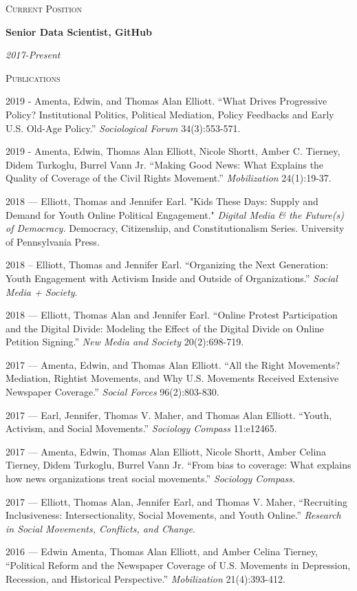 \documentclass[11pt]{article}
\newcommand{\sectionheader}[1]{
{\Large
\textsc{#1}}
}
\newcommand{\resumeitem}[2]{
\begin{minipage}{0.7\textwidth}
\begin{flushleft}
\textbf{#1}
\end{flushleft}
\end{minipage}
\begin{minipage}{0.3\textwidth}
\begin{flushright}
\emph{#2}
\end{flushright}
\end{minipage}
\hangindent=0.05\textwidth
}
\begin{document}
\sectionheader{Current Position}

\resumeitem{Senior Data Scientist, GitHub}{2017-Present}


\sectionheader{Publications}

2019 - Amenta, Edwin, and Thomas Alan Elliott. ``What Drives Progressive Policy? Institutional Politics, Political Mediation, Policy Feedbacks and Early U.S. Old-Age Policy.'' \textit{Sociological Forum} 34(3):553-571. 

2019 - Amenta, Edwin, Thomas Alan Elliott, Nicole Shortt, Amber C. Tierney, Didem Turkoglu, Burrel Vann Jr. ``Making Good News: What Explains the Quality of Coverage of the Civil Rights Movement.'' \textit{Mobilization} 24(1):19-37.

2018 --- Elliott, Thomas and Jennifer Earl. "Kids These Days: Supply and Demand for Youth Online Political Engagement." \textit{Digital Media \& the Future(s) of Democracy.} Democracy, Citizenship, and Constitutionalism Series. University of Pennsylvania Press.

2018 -- Elliott, Thomas and Jennifer Earl. ``Organizing the Next Generation: Youth Engagement with Activism Inside and Outside of Organizations.'' \textit{Social Media + Society}.

2018 --- Elliott, Thomas Alan and Jennifer Earl. ``Online Protest Participation and the Digital Divide: Modeling the Effect of the Digital Divide on Online Petition Signing.'' \textit{New Media and Society} 20(2):698-719.

2017 --- Amenta, Edwin, and Thomas Alan Elliott. ``All the Right Movements?
Mediation, Rightist Movements, and Why U.S. Movements Received Extensive Newspaper Coverage.'' \textit{Social Forces} 96(2):803-830. 

2017 --- Earl, Jennifer, Thomas V. Maher, and Thomas Alan Elliott. ``Youth, Activism, and Social Movements.'' \textit{Sociology Compass} 11:e12465.

2017 --- Amenta, Edwin, Thomas Alan Elliott, Nicole Shortt, Amber Celina Tierney, Didem Turkoglu, Burrel Vann Jr. ``From bias to coverage: What explains how news organizations treat social movements.'' \textit{Sociology Compass}. 

2017 --- Elliott, Thomas Alan, Jennifer Earl, and Thomas V. Maher, ``Recruiting Inclusiveness: Intersectionality, Social Movements, and Youth Online.'' \textit{Research in Social Movements, Conflicts, and Change}.

2016 --- Edwin Amenta, Thomas Alan Elliott, and Amber Celina Tierney, ``Political Reform and the Newspaper Coverage of U.S. Movements in Depression, Recession, and Historical Perspective.'' \textit{Mobilization} 21(4):393-412.
\end{document}
